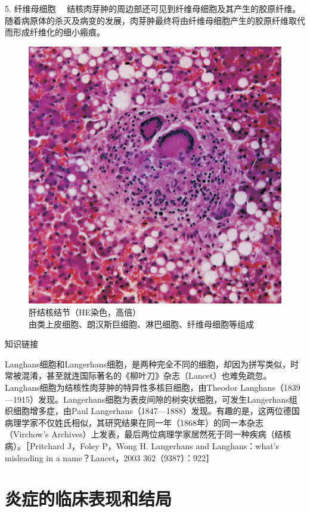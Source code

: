{5. 纤维母细胞}
　结核肉芽肿的周边部还可见到纤维母细胞及其产生的胶原纤维。随着病原体的杀灭及病变的发展，肉芽肿最终将由纤维母细胞产生的胶原纤维取代而形成纤维化的细小瘢痕。

\begin{figure}[!htbp]
 \centering
 \includegraphics{./images/Image00064.jpg}
 \caption{肝结核结节（HE染色，高倍）\\ {\small 由类上皮细胞、朗汉斯巨细胞、淋巴细胞、纤维母细胞等组成}}
 \label{fig4-13}
  \end{figure} 



{知识链接}

Langhans细胞和Langerhans细胞，是两种完全不同的细胞，却因为拼写类似，时常被混淆，甚至就连国际著名的《柳叶刀》杂志（Lancet）也难免疏忽。Langhans细胞为结核性肉芽肿的特异性多核巨细胞，由Theodor
Langhans（1839---1915）发现。Langerhans细胞为表皮间隙的树突状细胞，可发生Langerhans组织细胞增多症，由Paul
Langerhans（1847---1888）发现。有趣的是，这两位德国病理学家不仅姓氏相似，其研究结果在同一年（1868年）的同一本杂志（Virchow's
Archives）上发表，最后两位病理学家居然死于同一种疾病（结核病）。［Pritchard
J，Foley P，Wong H. Langerhans and Langhans：what's misleading in a
name？Lancet，2003 362（9387）：922］

\section{炎症的临床表现和结局}

